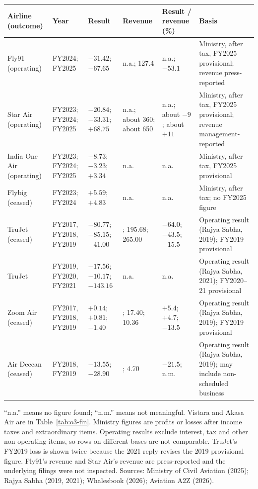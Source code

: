 \documentclass[12pt,a4paper]{article}
\newenvironment{o3box}{\ifthenelse{\boolean{o3highlight}}{\begingroup\color{o3sky}}{}}{\ifthenelse{\boolean{o3highlight}}{\endgroup}{}}
\begin{document}
\begin{o3box}
\begin{minipage}{\textwidth}
\footnotesize
\setlength{\tabcolsep}{3pt}
\label{tab:o3-fy25}
\noindent\begin{tabularx}{\textwidth}{|>{\raggedright\arraybackslash}p{}|>{\raggedright\arraybackslash}p{}|>{\raggedright\arraybackslash}p{}|>{\raggedright\arraybackslash}p{}|>{\raggedright\arraybackslash}p{}|>{\raggedright\arraybackslash}X|}
\hline
\textbf{Airline (outcome)} & \textbf{Year} & \textbf{Result} & \textbf{Revenue} & \textbf{Result / revenue (\%)} & \textbf{Basis} \\
\hline
Fly91 (operating) & FY2024; FY2025 & $-31.42$; $-67.65$ & n.a.; 127.4 & n.a.; $-53.1$ & Ministry, after tax, FY2025 provisional; revenue press-reported \\
\hline
Star Air (operating) & FY2023; FY2024; FY2025 & $-20.84$; $-33.31$; $+68.75$ & n.a.; about 360; about 650 & n.a.; about $-9$; about $+11$ & Ministry, after tax, FY2025 provisional; revenue management-reported \\
\hline
India One Air (operating) & FY2023; FY2024; FY2025 & $-8.73$; $-3.23$; $+3.34$ & n.a. & n.a. & Ministry, after tax, FY2025 provisional \\
\hline
Flybig (ceased) & FY2023; FY2024 & $+5.59$; $+4.83$ & n.a. & n.a. & Ministry, after tax; no FY2025 figure \\
\hline
TruJet (ceased) & FY2017, FY2018, FY2019 & $-80.77$; $-85.15$; $-41.00$ & 126.14; 195.68; 265.00 & $-64.0$; $-43.5$; $-15.5$ & Operating result (Rajya Sabha, 2019); FY2019 provisional \\
\hline
TruJet & FY2019, FY2020, FY2021 & $-17.56$; $-10.17$; $-143.16$ & n.a. & n.a. & Operating result (Rajya Sabha, 2021); FY2020--21 provisional \\
\hline
Zoom Air (ceased) & FY2017, FY2018, FY2019 & $+0.14$; $+0.81$; $-1.40$ & 2.61; 17.40; 10.36 & $+5.4$; $+4.7$; $-13.5$ & Operating result (Rajya Sabha, 2019); FY2019 provisional \\
\hline
Air Deccan (ceased) & FY2018, FY2019 & $-13.55$; $-28.90$ & 62.93; 4.70 & $-21.5$; n.m. & Operating result (Rajya Sabha, 2019); may include non-scheduled business \\
\hline
\end{tabularx}
\par\raggedright\footnotesize ``n.a.'' means no figure found; ``n.m.'' means not meaningful. Vistara and Akasa Air are in Table~\ref{tab:o3-fin}. Ministry figures are profits or losses after income taxes and extraordinary items. Operating results exclude interest, tax and other non-operating items, so rows on different bases are not comparable. TruJet's FY2019 loss is shown twice because the 2021 reply revises the 2019 provisional figure. Fly91's revenue and Star Air's revenue are press-reported and the underlying filings were not inspected. Sources: Ministry of Civil Aviation (2025); Rajya Sabha (2019, 2021); Whalesbook (2026); Aviation A2Z (2026).

\end{minipage}
\end{o3box}
\end{document}
